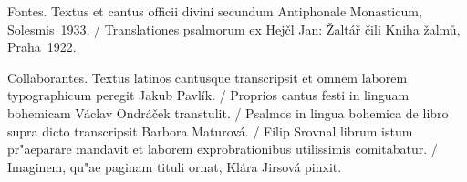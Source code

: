 \documentclass[a4paper, twoside, 12pt]{article}
\begin{document}
\cantusSineNeumas

\capitulumDiei

\responsoriumAdVesperas

\vfill

\begin{multicols}{3}
\nlfont
\translatioHymnusVesp
\end{multicols}

\pagebreak

\hymnusAdVesperas

\vfill

\versiculusDiei

\pagebreak

\cantusCumNeumis



\cantusSineNeumas




\vfill

\pagebreak

\label{oratioetc}

\anteOrationem

\pagebreak

\oratioDiei

\translatioOrationis

\benedicamusDomino

\inFineHorarum

\pagebreak

\pagestyle{empty}

Fontes. 
Textus et cantus officii divini secundum 
Antiphonale Monasticum, Solesmis~1933. /
Translationes psalmorum ex
Hejčl Jan: Žaltář čili Kniha žalmů, Praha~1922.

Collaborantes.
Textus latinos cantusque transcripsit et omnem laborem typographicum peregit
Jakub Pavlík. /
Proprios cantus festi in linguam bohemicam Václav Ondráček transtulit. /
Psalmos in lingua bohemica de libro supra dicto transcripsit
Barbora Maturová. /
Filip Srovnal librum istum pr"aeparare mandavit et laborem exprobrationibus
utilissimis comitabatur. /
Imaginem, qu"ae paginam tituli ornat, Klára Jirsová pinxit.
\end{document}
